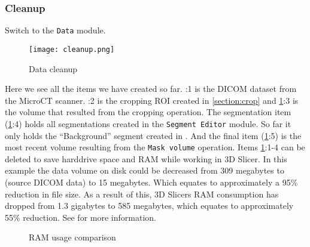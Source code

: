 \subsubsection{Cleanup}
Switch to the \texttt{Data} module.
\begin{figure}[h!]
	\centerline{
		\texttt{[image: cleanup.png]}}
	\caption{Data cleanup}\label{fig:clr}
\end{figure}
\noindent
Here we see all the items we have created so far.
:1 is the DICOM dataset from the MicroCT scanner.
:2 is the cropping ROI created in \cref{section:crop} and \cref{fig:clr}:3 is the volume that resulted from the cropping operation.
The segmentation item (\cref{fig:clr}:4) holds all segmentations created in the \texttt{Segment Editor} module. So far it only holds the ``Background'' segment created in . And the final item (\cref{fig:clr}:5) is the most recent volume resulting from the \texttt{Mask volume} operation.
Items \cref{fig:clr}:1-4 can be deleted to save harddrive space and RAM while working in 3D Slicer.
\noindent
In this example the data volume on disk could be decreased from 309 megabytes to (source DICOM data) to 15 megabytes.
Which equates to approximately a 95\% reduction in file size.
As a result of this, 3D Slicers RAM consumption has dropped from 1.3 gigabytes to 585 megabytes, which equates to approximately 55\% reduction.
See  for more information.
\newline
\begin{figure}
	\caption{RAM usage comparison}\label{fig:ramUC}
\end{figure}
\pagebreak


